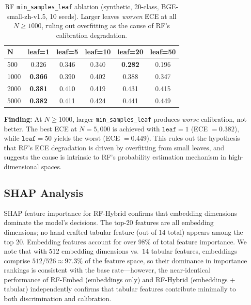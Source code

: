 \documentclass[11pt]{article}
\begin{document}
\begin{table}[t]
\centering
\caption{RF \texttt{min\_samples\_leaf} ablation (synthetic, 20-class, BGE-small-zh-v1.5, 10 seeds). Larger leaves \emph{worsen} ECE at all $N{\geq}1000$, ruling out overfitting as the cause of RF's calibration degradation.}
\label{tab:leaf}
\begin{tabular}{@{}lccccc@{}}
\toprule
$\boldsymbol{N}$ & \textbf{leaf=1} & \textbf{leaf=5} & \textbf{leaf=10} & \textbf{leaf=20} & \textbf{leaf=50} \\
\midrule
500  & 0.326 & 0.346 & 0.340 & \textbf{0.282} & 0.196 \\
1000 & \textbf{0.366} & 0.390 & 0.402 & 0.388 & 0.347 \\
2000 & \textbf{0.381} & 0.410 & 0.419 & 0.431 & 0.415 \\
5000 & \textbf{0.382} & 0.411 & 0.424 & 0.441 & 0.449 \\
\bottomrule
\end{tabular}
\end{table}

\textbf{Finding:} At $N{\geq}1000$, larger \texttt{min\_samples\_leaf} produces \emph{worse} calibration, not better. The best ECE at $N{=}5{,}000$ is achieved with $\texttt{leaf}{=}1$ (ECE $=0.382$), while $\texttt{leaf}{=}50$ yields the worst (ECE $=0.449$). This rules out the hypothesis that RF's ECE degradation is driven by overfitting from small leaves, and suggests the cause is intrinsic to RF's probability estimation mechanism in high-dimensional spaces.

\subsection{SHAP Analysis}

SHAP feature importance for RF-Hybrid confirms that embedding dimensions dominate the model's decisions. The top-20 features are all embedding dimensions; no hand-crafted tabular feature (out of 14 total) appears among the top 20. Embedding features account for over 98\% of total feature importance. We note that with 512 embedding dimensions vs.\ 14 tabular features, embeddings comprise $512/526 \approx 97.3\%$ of the feature space, so their dominance in importance rankings is consistent with the base rate---however, the near-identical performance of RF-Embed (embeddings only) and RF-Hybrid (embeddings + tabular) independently confirms that tabular features contribute minimally to both discrimination and calibration.
\end{document}
